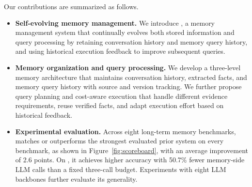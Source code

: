 Our contributions are summarized as follows.
\begin{itemize}[leftmargin=*,nosep]
\item \textbf{Self-evolving memory management.}
We introduce \sys{}, a memory management system that continually evolves both stored information and query processing by retaining conversation history and memory query history, and using historical execution feedback to improve subsequent queries.

\item \textbf{Memory organization and query processing.}
We develop a three-level memory architecture that maintains conversation history, extracted facts, and memory query history with source and version tracking.
We further propose query planning and cost-aware execution that handle different evidence requirements, reuse verified facts, and adapt execution effort based on historical feedback.

\item \textbf{Experimental evaluation.}
Across eight long-term memory benchmarks, \sys{} matches or outperforms the strongest evaluated prior system on every benchmark, as shown in Figure~\ref{fig:scoreboard}, with an average improvement of 2.6 points.
On \membench{}, it achieves higher accuracy with 50.7\% fewer memory-side LLM calls than a fixed three-call budget. Experiments with eight LLM backbones further evaluate its generality.
\end{itemize}


